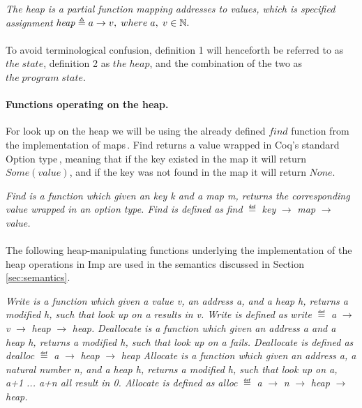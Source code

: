  \textit{The heap is a partial function mapping addresses to values, which is specified assignment} $\mathit{heap} \mathrel{\triangleq} a\to v, \; where\; a, \;v \in \mathbb{N}.$

\paragraph{}
To avoid terminological confusion, definition 1 will henceforth be referred to as $the\;state$, definition 2 as $the\;heap$, and the combination of the two as $the\;program\;state$.

\paragraph{Functions operating on the heap.}
For look up on the heap we will be using the already defined $find$ function from the implementation of maps\,\cite{CoqContainers}. Find returns a value wrapped in Coq's standard Option type\,\cite{CoqOption}, meaning that if the key existed in the map it will return $Some(value)$, and if the key was not found in the map it will return $None$.

 \textit{Find is a function which given an key k and a map m, returns the corresponding value wrapped in an option type. Find is defined as }{\it find} $\eqdef$ {\it key} $\to$ {\it map} $\to$ {\it value.}

\paragraph{}
The following heap-manipulating functions underlying the implementation of the heap operations in Imp are used in the semantics discussed in Section \ref{sec:semantics}.

\textit{Write is a function which given a value v, an address a, and a heap h, returns a modified h, such that look up on a results in v. Write is defined as} {\it write} $\eqdef$ {\it a} $\to$ {\it v} $\to$ {\it heap} $\to$ {\it heap.}
 \textit{Deallocate is a function which given an address a and a heap h, returns a modified h, such that look up on a fails. Deallocate is defined as }{\it dealloc} $\eqdef$ {\it a} $\to$ {\it heap} $\to$ {\it heap}
 \textit{Allocate is a function which given an address a, a natural number n, and a heap h, returns a modified h, such that look up on a, a+1 ... a+n all result in 0. Allocate is defined as }{\it alloc} $\eqdef$ {\it a} $\to$ {\it n} $\to$ {\it heap} $\to$ {\it heap.}

